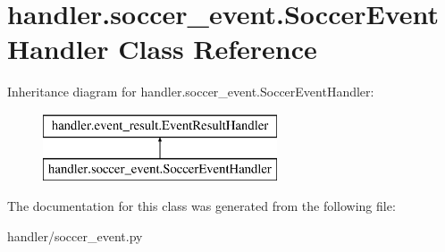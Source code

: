 \hypertarget{classhandler_1_1soccer__event_1_1_soccer_event_handler}{}\section{handler.\+soccer\+\_\+event.\+Soccer\+Event\+Handler Class Reference}
\label{classhandler_1_1soccer__event_1_1_soccer_event_handler}
Inheritance diagram for handler.\+soccer\+\_\+event.\+Soccer\+Event\+Handler\+:\begin{figure}[H]
\begin{center}
\leavevmode
\includegraphics[height=2.000000cm]{classhandler_1_1soccer__event_1_1_soccer_event_handler}
\end{center}
\end{figure}


The documentation for this class was generated from the following file\+:\begin{DoxyCompactItemize}
\item 
handler/soccer\+\_\+event.\+py\end{DoxyCompactItemize}
